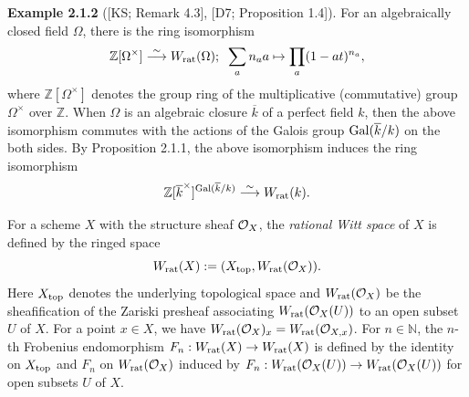 \documentclass[12pt, leqno]{article}
\begin{document}
\\ 
\\
{\bf Example 2.1.2} ([KS; Remark 4.3], [D7; Proposition 1.4]).  For an algebraically closed field $\Omega$, there is the ring isomorphism
$$  \mathbb{Z}[\Omega^{\times}] \stackrel{\sim}{\longrightarrow} W_{\rm rat}(\Omega); \;\; \sum_a {n_a} a \mapsto \prod_a (1-at)^{n_a}, $$
 where $\mathbb{Z}[\Omega^{\times}]$ denotes the group ring of the multiplicative (commutative) group $\Omega^{\times}$ over $\mathbb{Z}$. When $\Omega$ is an algebraic closure $\overline{k}$ of a perfect field $k$, then the above isomorphism commutes with the actions of the Galois group ${\rm Gal}(\overline{k}/k)$ on the both sides. By Proposition 2.1.1, the above isomorphism induces the ring isomorphism
 $$ \mathbb{Z}[\overline{k}^{\times}]^{{\rm Gal}(\overline{k}/k)} \stackrel{\sim}{\longrightarrow} W_{\rm rat}(k).$$
 \vspace{0.02cm}
 
For  a scheme $X$ with the structure sheaf ${\cal O}_X$, the {\it rational Witt space} of $X$ is defined by the ringed  space
$$ W_{\rm rat}(X) := (X_{\rm top}, W_{\rm rat}({\cal O}_X)).$$
Here $X_{\rm top}$ denotes the underlying topological space and $W_{\rm rat}({\cal O}_X)$ be the sheafification of the Zariski presheaf associating $W_{\rm rat}({\cal O}_X(U))$ to  an open subset $U$ of $X$. For a point $x \in X$, we have $W_{\rm rat}({\cal O}_X)_x = W_{\rm rat}({\cal O}_{X,x})$. For $n \in \mathbb{N}$,  the $n$-th Frobenius endomorphism $F_n : W_{\rm rat}(X) \rightarrow W_{\rm rat}(X)$ is defined by the identity on $X_{\rm top}$ and $F_n$ on $W_{\rm rat}({\cal O}_X)$ induced by $F_n : W_{\rm rat}({\cal O}_X(U)) \rightarrow W_{\rm rat}({\cal O}_X(U))$ for open subsets $U$ of $X$.   
\end{document}
